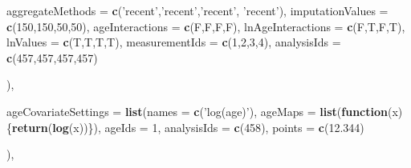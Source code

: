 \documentclass[
]{article}
\newenvironment{Shaded}{\begin{snugshade}}{\end{snugshade}}
\newcommand{\ControlFlowTok}[1]{\textcolor[rgb]{0.13,0.29,0.53}{\textbf{#1}}}
\newcommand{\DataTypeTok}[1]{\textcolor[rgb]{0.13,0.29,0.53}{#1}}
\newcommand{\DecValTok}[1]{\textcolor[rgb]{0.00,0.00,0.81}{#1}}
\newcommand{\FloatTok}[1]{\textcolor[rgb]{0.00,0.00,0.81}{#1}}
\newcommand{\KeywordTok}[1]{\textcolor[rgb]{0.13,0.29,0.53}{\textbf{#1}}}
\newcommand{\NormalTok}[1]{#1}
\newcommand{\StringTok}[1]{\textcolor[rgb]{0.31,0.60,0.02}{#1}}
\begin{document}
\begin{Shaded}
\begin{Highlighting}[]
{{{{                                                          \DataTypeTok{aggregateMethods =} \KeywordTok{c}\NormalTok{(}\StringTok{'recent'}\NormalTok{,}\StringTok{'recent'}\NormalTok{,}\StringTok{'recent'}\NormalTok{, }\StringTok{'recent'}\NormalTok{),}
                                                          \DataTypeTok{imputationValues =} \KeywordTok{c}\NormalTok{(}\DecValTok{150}\NormalTok{,}\DecValTok{150}\NormalTok{,}\DecValTok{50}\NormalTok{,}\DecValTok{50}\NormalTok{),}
                                                          \DataTypeTok{ageInteractions =} \KeywordTok{c}\NormalTok{(F,F,F,F),}
                                                          \DataTypeTok{lnAgeInteractions =} \KeywordTok{c}\NormalTok{(F,T,F,T),}
                                                          \DataTypeTok{lnValues =} \KeywordTok{c}\NormalTok{(T,T,T,T),}
                                                          \DataTypeTok{measurementIds =} \KeywordTok{c}\NormalTok{(}\DecValTok{1}\NormalTok{,}\DecValTok{2}\NormalTok{,}\DecValTok{3}\NormalTok{,}\DecValTok{4}\NormalTok{), }
                                                          \DataTypeTok{analysisIds =} \KeywordTok{c}\NormalTok{(}\DecValTok{457}\NormalTok{,}\DecValTok{457}\NormalTok{,}\DecValTok{457}\NormalTok{,}\DecValTok{457}\NormalTok{)}
                                                          
                                                          
\NormalTok{                      ),}
                      
                      \DataTypeTok{ageCovariateSettings =} \KeywordTok{list}\NormalTok{(}\DataTypeTok{names =} \KeywordTok{c}\NormalTok{(}\StringTok{'log(age)'}\NormalTok{),}
                                                  \DataTypeTok{ageMaps =} \KeywordTok{list}\NormalTok{(}\ControlFlowTok{function}\NormalTok{(x)\{}\KeywordTok{return}\NormalTok{(}\KeywordTok{log}\NormalTok{(x))\}),}
                                                  \DataTypeTok{ageIds =} \DecValTok{1}\NormalTok{,}
                                                  \DataTypeTok{analysisIds =} \KeywordTok{c}\NormalTok{(}\DecValTok{458}\NormalTok{),}
                                                  \DataTypeTok{points =} \KeywordTok{c}\NormalTok{(}\FloatTok{12.344}\NormalTok{)}
                                                  
\NormalTok{                      ),}
                      
}}}}
\end{Highlighting}
\end{Shaded}
\end{document}
